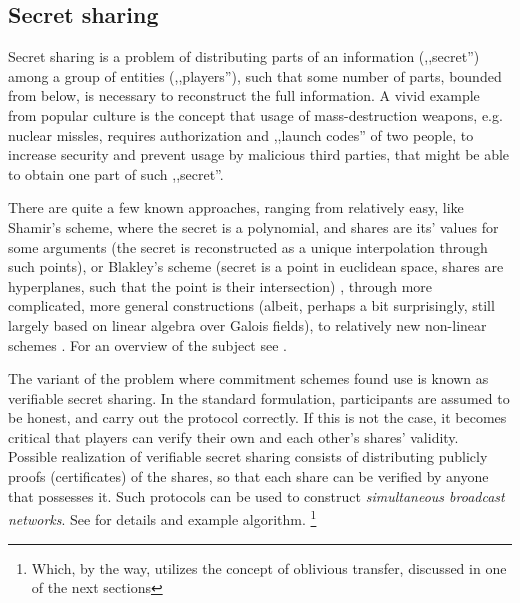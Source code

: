 \documentclass[10pt]{article}
\begin{document}
\subsection{Secret sharing}

Secret sharing is a problem of distributing parts of an information (,,secret'') among a group of
entities (,,players''), such that some number of parts, bounded from below, is necessary to 
reconstruct the full information. A vivid example from popular culture is the concept that usage
of mass-destruction weapons, e.g. nuclear missles, requires authorization and ,,launch codes'' of
two people, to increase security and prevent usage by malicious third parties, that might be able
to obtain one part of such ,,secret''.

There are quite a few known approaches, ranging from relatively easy, like Shamir's scheme, where
the secret is a polynomial, and shares are its' values for some arguments (the secret is reconstructed
as a unique interpolation through such points), or Blakley's scheme (secret is a point in euclidean
space, shares are hyperplanes, such that the point is their intersection) \footnotemark, through more
complicated, more general constructions (albeit, perhaps a bit surprisingly, still largely based on linear
algebra over Galois fields), to relatively new non-linear schemes \cite{Beimel01onthe}. For an overview 
of the subject see \cite{SharingSurvey}.



The variant of the problem where commitment schemes found use is known as verifiable secret sharing.
In the standard formulation, participants are assumed to be honest, and carry out the protocol correctly.
If this is not the case, it becomes critical that players can verify their own and each other's shares'
validity. Possible realization of verifiable secret sharing consists of distributing publicly proofs
(certificates) of the shares, so that each share can be verified by anyone that possesses it. Such
protocols can be used to construct \emph{simultaneous broadcast networks}. See \cite{VerifiableSharing}
for details and example algorithm. 
\footnote{Which, by the way, utilizes the concept of oblivious transfer, discussed in one of the next
sections}
\end{document}
